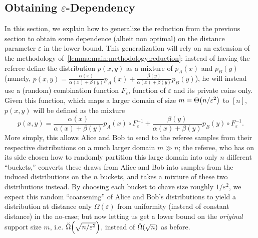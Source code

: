 \documentclass[11pt]{article}
\theoremstyle{remark}   	\newtheorem{remark}[theorem]{Remark}
\theoremstyle{definition}   	\newaliascnt{defn}{theorem}
\newcommand{\eps}{\ensuremath{\varepsilon}\xspace}
\newcommand{\no}{{\sf{}no}\xspace}
\newcommand{\bigTheta}[1]{{\Theta\mleft( #1 \mright)}}
\newcommand{\tildeOmega}[1]{\operatorname{\tilde{\Omega}}\mleft( #1 \mright)}
\begin{document}
\subsection{Obtaining $\eps$-Dependency}\label{sec:eps_dep}
In this section, we explain how to generalize the reduction from the previous section to obtain some dependence (albeit non optimal) on the distance parameter $\eps$ in the lower bound. This generalization will rely on an extension of the methodology of~\autoref{lemma:main:methodology:reduction}: instead of having the referee define the distribution $p(x,y)$ as a mixture of $p_A(x)$ and $p_B(y)$ (namely, $p(x,y) = \frac{\alpha(x)}{\alpha(x)+\beta(y)}p_A(x)+\frac{\beta(y)}{\alpha(x)+\beta(y)}p_B(y)$), he will instead use a (random) combination function $F_\eps$, function of $\eps$ and its private coins only. Given this function, which maps a larger domain of size $m=\bigTheta{n/\eps^2}$ to $[n]$, $p(x,y)$ will be defined as the mixture
\[
    p(x,y) = \frac{\alpha(x)}{\alpha(x)+\beta(y)}p_A(x) \circ F_\eps^{-1} +  \frac{\beta(y)}{\alpha(x)+\beta(y)} p_B(y) \circ F_\eps^{-1}.
\]
More simply, this allows Alice and Bob to send to the referee samples from their respective distributions on a much larger domain $m \gg n$; the referee, who has on its side chosen how to randomly partition this large domain into only $n$ different ``buckets,'' converts these draws from Alice and Bob into samples from the induced distributions on the $n$ buckets, and takes a mixture of these two distributions instead. By choosing each bucket to chave size roughly $1/\eps^2$, we expect this random ``coarsening'' of Alice and Bob's distributions to yield a distribution at distance only $\Omega(\eps)$ from uniformity (instead of constant distance) in the \no-case; but now letting us get a lower bound on the \emph{original} support size $m$, i.e. $\tildeOmega{\sqrt{n/\eps^2}}$, instead of $\tildeOmega{\sqrt{n}}$ as before.
\end{document}
